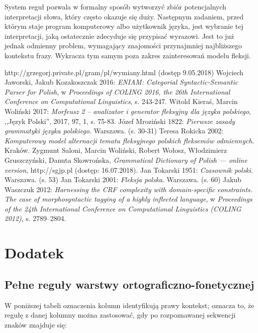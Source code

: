 \documentclass{article}
\begin{document}
System reguł pozwala w formalny sposób wytworzyć zbiór potencjalnych interpretacji słowa, który często okazuje się duży.
Następnym zadaniem, przed którym staje program komputerowy albo użytkownik języka, jest wybranie tej interpretacji,
jaką ostatecznie zdecyduje się przypisać wyrazowi. Jest to już jednak odmienny problem, wymagający znajomości
przynajmniej najbliższego kontekstu frazy.
Wykracza tym samym poza zakres zainteresowań modelu fleksji.

\begin{thebibliography}{1}
	 http://grzegorj.private.pl/gram/pl/wymiany.html (dostęp 9.05.2018)
	 Wojciech Jaworski, Jakub Kozakoszczak 2016: \textit{ENIAM: Categorial Syntactic-Semantic Parser for Polish},
		w \textit{Proceedings of COLING 2016, the 26th International Conference on Computational Linguistics},
		s. 243-247.
	 Witold Kieraś, Marcin Woliński 2017: \textit{Morfeusz 2 – analizator i generator fleksyjny dla języka polskiego},
		,,Język Polski'', 2017, 97, 1, s. 75-83.
	 Józef Mroziński 1822: \textit{Pierwsze zasady grammatyki języka polskiego}. Warszawa. (s. 30-31)
	 Teresa Rokicka 2002: \textit{Komputerowy model alternacji tematu fleksyjnego polskich fleksemów odmiennych}. Kraków.
	 Zygmunt Saloni, Marcin Woliński, Robert Wołosz, Włodzimierz Gruszczyński, Danuta Skowrońska,
		\textit{Grammatical Dictionary of Polish — online version},
		http://sgjp.pl (dostęp: 16.07.2018).
	 Jan Tokarski 1951: \textit{Czasownik polski}. Warszawa. (s. 53)
	 Jan Tokarski 2001: \textit{Fleksja polska}. Warszawa. (s. 60)
	 Jakub Waszczuk 2012: \textit{Harnessing the CRF complexity with domain-specific constraints. The case of morphosyntactic tagging of a highly inflected language},
		w \textit{Proceedings of the 24th International Conference on Computational Linguistics (COLING 2012)},
		s. 2789–2804.
\end{thebibliography}

\section{Dodatek}
\subsection{Pełne reguły warstwy ortograficzno-fonetycznej}

W poniższej tabeli oznaczenia kolumn identyfikują prawy kontekst; oznacza to, że regułę z danej kolumny można zastosować, gdy po rozpoznawanej sekwencji znaków znajduje się:
\end{document}
